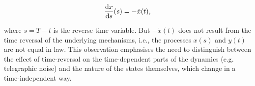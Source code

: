 \begin{equation}
\frac{\mathrm{d} x}{\mathrm{d} s}(s) = -\dot{x}(t),
\end{equation}

where $s = T-t$ is the reverse-time variable. But $-\dot{x}(t)$ does not result from the time reversal of the underlying mechanisms, i.e., the processes $x(s)$ and $y(t)$ are not equal in law. This observation emphasises the need to distinguish between the effect of time-reversal on the time-dependent parts of the dynamics (e.g. telegraphic noise) and the nature of the states themselves, which change in a time-independent way.



